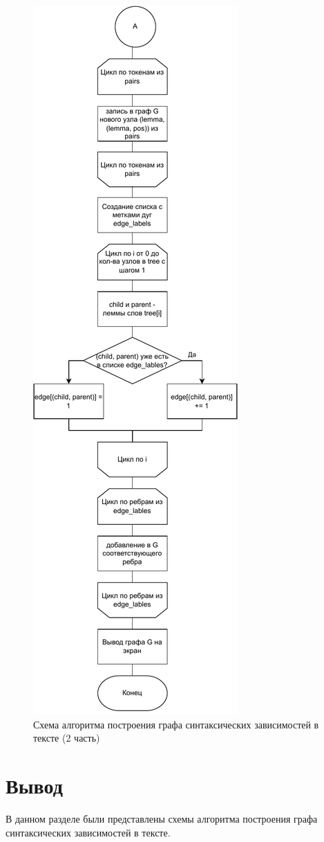 \begin{figure}[h!]
	\centering
	\includegraphics[width=0.4\linewidth]{img/alg2}
	\caption{Схема алгоритма построения графа синтаксических зависимостей в тексте (2 часть)}
	\label{fig:alg2}
\end{figure}

\clearpage

\section*{Вывод}

В данном разделе были представлены схемы алгоритма построения графа синтаксических зависимостей в тексте.